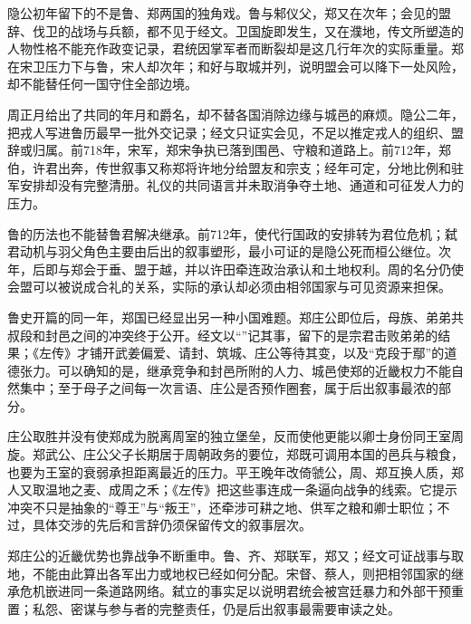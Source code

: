 隐公初年留下的不是鲁、郑两国的独角戏。鲁与邾仪父，郑又在次年；会见的盟辞、伐卫的战场与兵额，都不见于经文。卫国旋即发生，又在濮地，传文所塑造的人物性格不能充作政变记录，君统因掌军者而断裂却是这几行年次的实际重量。郑在宋卫压力下与鲁，宋人却次年；和好与取城并列，说明盟会可以降下一处风险，却不能替任何一国守住全部边境。

周正月给出了共同的年月和爵名，却不替各国消除边缘与城邑的麻烦。隐公二年，把戎人写进鲁历最早一批外交记录；经文只证实会见，不足以推定戎人的组织、盟辞或归属。前718年，宋军，郑宋争执已落到围邑、守粮和道路上。前712年，郑伯，许君出奔，传世叙事又称郑将许地分给盟友和宗支；经年可定，分地比例和驻军安排却没有完整清册。礼仪的共同语言并未取消争夺土地、通道和可征发人力的压力。

鲁的历法也不能替鲁君解决继承。前712年，使代行国政的安排转为君位危机；弑君动机与羽父角色主要由后出的叙事塑形，最小可证的是隐公死而桓公继位。次年，后即与郑会于垂、盟于越，并以许田牵连政治承认和土地权利。周的名分仍使会盟可以被说成合礼的关系，实际的承认却必须由相邻国家与可见资源来担保。

鲁史开篇的同一年，郑国已经显出另一种小国难题。郑庄公即位后，母族、弟弟共叔段和封邑之间的冲突终于公开。经文以“”记其事，留下的是宗君击败弟弟的结果；《左传》才铺开武姜偏爱、请封、筑城、庄公等待其变，以及“克段于鄢”的道德张力。可以确知的是，继承竞争和封邑所附的人力、城邑使郑的近畿权力不能自然集中；至于母子之间每一次言语、庄公是否预作圈套，属于后出叙事最浓的部分。

庄公取胜并没有使郑成为脱离周室的独立堡垒，反而使他更能以卿士身份同王室周旋。郑武公、庄公父子长期居于周朝政务的要位，郑既可调用本国的邑兵与粮食，也要为王室的衰弱承担距离最近的压力。平王晚年改倚虢公，周、郑互换人质，郑人又取温地之麦、成周之禾；《左传》把这些事连成一条逼向战争的线索。它提示冲突不只是抽象的“尊王”与“叛王”，还牵涉可耕之地、供军之粮和卿士职位；不过，具体交涉的先后和言辞仍须保留传文的叙事层次。

郑庄公的近畿优势也靠战争不断重申。鲁、齐、郑联军，郑又；经文可证战事与取地，不能由此算出各军出力或地权已经如何分配。宋督、蔡人，则把相邻国家的继承危机嵌进同一条道路网络。弑立的事实足以说明君统会被宫廷暴力和外部干预重置；私怨、密谋与参与者的完整责任，仍是后出叙事最需要审读之处。

